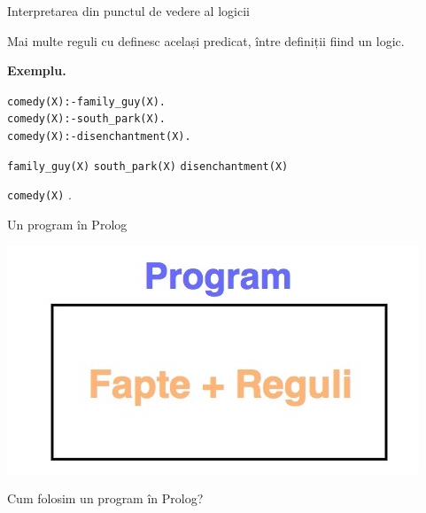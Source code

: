 \documentclass[xcolor=pdftex,romanian,colorlinks]{beamer}
\begin{document}
\begin{frame}{Interpretarea din punctul de vedere al logicii}

Mai multe reguli cu  definesc același predicat, între definiții fiind un  logic. 


\vspace{.2cm}
\textbf{\color{True} Exemplu.}
\vspace{-.2cm}
\begin{alltt}
comedy(X) :- family\_guy(X).\\
comedy(X) :- south\_park(X).\\
comedy(X) :- disenchantment(X).\\
\end{alltt}
\smallskip

 \texttt{family\_guy(X)} 
\texttt{south\_park(X)} 
 \texttt{disenchantment(X)}  
  
\texttt{comedy(X)} .


\end{frame}


\begin{frame}{Un program în Prolog}

\begin{center}

\includegraphics[scale=.3]{images/Prolog1}

\vspace*{1cm}

Cum folosim un program  în Prolog?
\end{center}


\end{frame}
\end{document}
